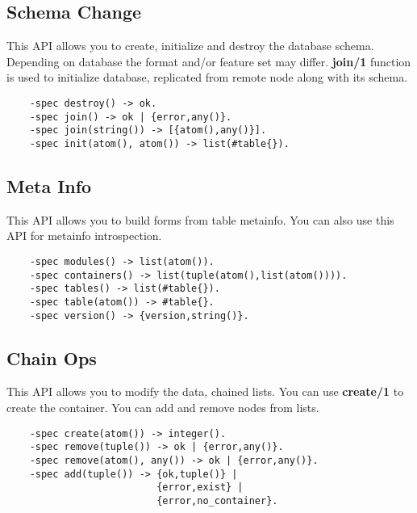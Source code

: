 \subsection{Schema Change}
This API allows you to create, initialize and destroy the database schema.
Depending on database the format and/or feature set may differ. {\bf join/1} function
is used to initialize database, replicated from remote node along with its schema.

\vspace{1\baselineskip}
\begin{lstlisting}
    -spec destroy() -> ok.
    -spec join() -> ok | {error,any()}.
    -spec join(string()) -> [{atom(),any()}].
    -spec init(atom(), atom()) -> list(#table{}).
\end{lstlisting}
\vspace{1\baselineskip}

\subsection{Meta Info}
This API allows you to build forms from table metainfo.
You can also use this API for metainfo introspection.

\vspace{1\baselineskip}
\begin{lstlisting}
    -spec modules() -> list(atom()).
    -spec containers() -> list(tuple(atom(),list(atom()))).
    -spec tables() -> list(#table{}).
    -spec table(atom()) -> #table{}.
    -spec version() -> {version,string()}.
\end{lstlisting}
\vspace{1\baselineskip}

\subsection{Chain Ops}
This API allows you to modify the data, chained lists.
You can use {\bf create/1} to create the container.
You can add and remove nodes from lists.

\vspace{1\baselineskip}
\begin{lstlisting}
    -spec create(atom()) -> integer().
    -spec remove(tuple()) -> ok | {error,any()}.
    -spec remove(atom(), any()) -> ok | {error,any()}.
    -spec add(tuple()) -> {ok,tuple()} |
                          {error,exist} |
                          {error,no_container}.
\end{lstlisting}
\vspace{1\baselineskip}

